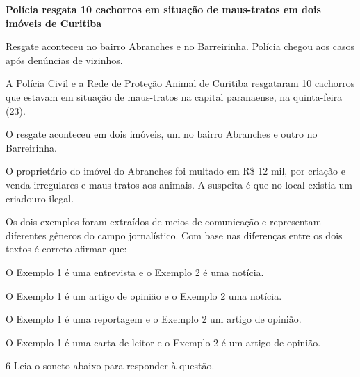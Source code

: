 \begin{myquote}

\textbf{Polícia resgata 10 cachorros em situação de maus-tratos em dois
imóveis de Curitiba}

Resgate aconteceu no bairro Abranches e no Barreirinha. Polícia chegou
aos casos após denúncias de vizinhos.

A Polícia Civil e a Rede de Proteção Animal de Curitiba resgataram 10
cachorros que estavam em situação de maus-tratos na capital paranaense,
na quinta-feira (23).

O resgate aconteceu em dois imóveis, um no bairro Abranches e outro no
Barreirinha.

O proprietário do imóvel do Abranches foi multado em R\$ 12 mil, por
criação e venda irregulares e maus-tratos aos animais. A suspeita é que
no local existia um criadouro ilegal.

\end{myquote}


Os dois exemplos foram extraídos de meios de comunicação e representam
diferentes gêneros do campo jornalístico. Com base nas diferenças entre
os dois textos é correto afirmar que:

\begin{escolha}
    
    \item O Exemplo 1 é uma entrevista e o Exemplo 2 é uma notícia.
    
    \item O Exemplo 1 é um artigo de opinião e o Exemplo 2 uma notícia.
    
    \item O Exemplo 1 é uma reportagem e o Exemplo 2 um artigo de opinião.
    
    \item O Exemplo 1 é uma carta de leitor e o Exemplo 2 é um artigo de opinião.

\end{escolha}

\num{6} Leia o soneto abaixo para responder à questão. 

